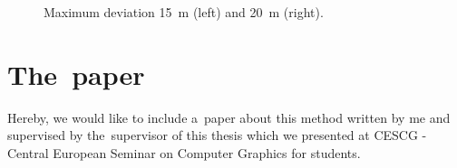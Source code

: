 \begin{figure}
	\begin{center}
		 \\ 
		  {} \\ 
		  {} \\ 
	\end{center}
	\caption{Maximum deviation 15~m (left) and 20~m (right).}
\end{figure}

\chapter{The~paper}
\label{att:paper}

Hereby, we would like to include a~paper about this method written by me and supervised by the~supervisor of this thesis which we presented at CESCG - Central European Seminar on Computer Graphics for students.
%
